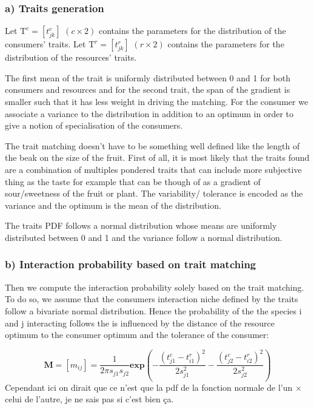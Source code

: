 \documentclass{article}
\begin{document}
\subsubsection{a) Traits generation}
Let $\textrm{T}^c = [t^c_{jk}]$ $(c \times 2)$ contains the parameters for the distribution of the consumers' traits. 
Let $\textrm{T}^r = [t^r_{jk}]$ $(r \times 2)$ contains the parameters for the distribution of the resources' traits. 

The first mean of the trait is uniformly distributed between 0 and 1 for both consumers and resources and for the second trait, the span of the gradient is smaller such that it has less weight in driving the matching. 
For the consumer we associate a variance to the distribution in addition to an optimum in order to give a notion of specialisation of the consumers.

The trait matching doesn't have to be something well defined like the length of the beak on the size of the fruit. First of all, it is most likely that the traits found are a combination of multiples pondered traits that can include more subjective thing as the taste for example that can be though of as a gradient of sour/sweetness of the fruit or plant.
The variability/ tolerance is encoded as the variance and the optimum is the mean of the distribution.

The traits PDF follows a normal distribution whose means are uniformly distributed between 0 and 1 and the variance follow a normal distribution.




\subsubsection{b) Interaction probability based on trait matching}
Then we compute the interaction probability  solely based on the trait matching. To do so, we assume that the consumers interaction niche defined by the traits follow a bivariate normal distribution. Hence the probability of the the species i and j interacting follows the is influenced by the distance of the resource optimum to the consumer optimum and the tolerance of the consumer:

$$\textbf{M} = [m_{ij}]=\frac{1}{2\pi s_{j1}s_{j2}} \textbf{exp}\left(-\frac{(t^c_{j1} - t^r_{i1})^2}{2s^2_{j1}} - \frac{(t^c_{j2} - t^r_{i2})^2}{2s^2_{j2}}\right)$$
Cependant ici on dirait que ce n'est que la pdf de la fonction normale de l'un $\times$ celui de l'autre, je ne sais pas si c'est bien ça.
\end{document}

